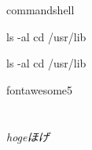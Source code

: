 \documentclass[aspectratio=169]{beamer}
\begin{document}
    \begin{frame}[fragile]{commandshell}{}
\begin{fullcommandshell}
ls -al
cd /usr/lib
\end{fullcommandshell}
\begin{commandshell}
    ls -al
    cd /usr/lib
\end{commandshell}
    \end{frame}

    \begin{frame}[fragile]{fontawesome5}{}
        \faGithub \\
        \faRust \\
        \faPython \\

        \emph{hogeほげ}
    \end{frame}
\end{document}
